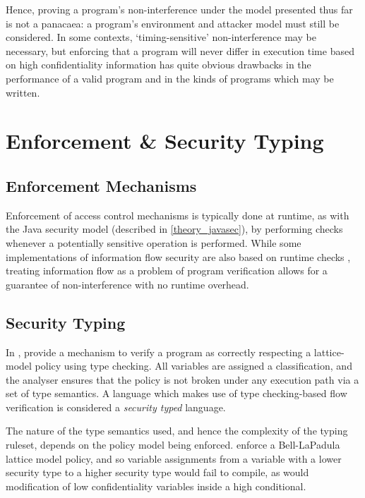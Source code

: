 Hence, proving a program's non-interference under the model presented thus far is not a panacaea: a program's environment and attacker model must still be considered. In some contexts, `timing-sensitive' non-interference may be necessary, but enforcing that a program will never differ in execution time based on high confidentiality information has quite obvious drawbacks in the performance of a valid program and in the kinds of programs which may be written.

\section{Enforcement \& Security Typing}

\subsection{Enforcement Mechanisms}

Enforcement of access control mechanisms is typically done at runtime, as with the Java security model (described in \ref{theory_javasec}), by performing checks whenever a potentially sensitive operation is performed. While some implementations of information flow security are also based on runtime checks \cite{austin2009runtimeflow}\cite{degroef2012flowfox}\cite{polikarpova2016lifty}, treating information flow as a problem of program verification allows for a guarantee of non-interference with no runtime overhead.

\subsection{Security Typing}

In , \citeauthor{denning1977certification} \cite{denning1977certification} provide a mechanism to verify a program as correctly respecting a lattice-model policy using type checking. All variables are assigned a classification, and the analyser ensures that the policy is not broken under any execution path via a set of type semantics. A language which makes use of type checking-based flow verification is considered a \textit{security typed} language.

The nature of the type semantics used, and hence the complexity of the typing ruleset, depends on the policy model being enforced. \citeauthor{denning1977certification} \cite{denning1977certification} enforce a Bell-LaPadula lattice model policy, and so variable assignments from a variable with a lower security type to a higher security type would fail to compile, as would modification of low confidentiality variables inside a high conditional.

